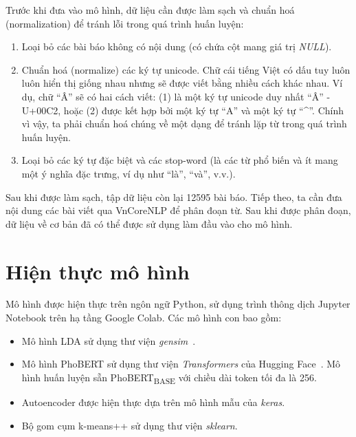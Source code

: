 Trước khi đưa vào mô hình, dữ liệu cần được làm sạch và chuẩn hoá (normalization) để tránh lỗi trong quá trình huấn luyện:
\begin{enumerate}
    \item Loại bỏ các bài báo không có nội dung (có chứa cột mang giá trị \textit{NULL}).
    \item Chuẩn hoá (normalize) các ký tự unicode. Chữ cái tiếng Việt có dấu tuy luôn luôn hiển thị giống nhau nhưng sẽ được viết bằng nhiều cách khác nhau. Ví dụ, chữ ``Â'' sẽ có hai cách viết: (1) là một ký tự unicode duy nhất ``Â'' - U+00C2, hoặc (2) được kết hợp bởi một ký tự ``A'' và một ký tự ``\^{}''. Chính vì vậy, ta phải chuẩn hoá chúng về một dạng để tránh lặp từ trong quá trình huấn luyện.
    \item Loại bỏ các ký tự đặc biệt và các stop-word (là các từ phổ biến và ít mang một ý nghĩa đặc trưng, ví dụ như ``là'', ``và'', v.v.).
\end{enumerate}

Sau khi được làm sạch, tập dữ liệu còn lại 12595 bài báo. Tiếp theo, ta cần đưa nội dung các bài viết qua VnCoreNLP để phân đoạn từ. Sau khi được phân đoạn, dữ liệu về cơ bản đã có thể được sử dụng làm đầu vào cho mô hình.

\section{Hiện thực mô hình}
Mô hình được hiện thực trên ngôn ngữ Python, sử dụng trình thông dịch Jupyter Notebook trên hạ tầng Google Colab. Các mô hình con bao gồm:

\begin{itemize}
    \item Mô hình LDA sử dụng thư viện \textit{gensim}~\cite{GensimTopicModelling2021}.
    \item Mô hình PhoBERT sử dụng thư viện \textit{Transformers} của Hugging Face~\cite{wolfTransformersStateoftheArtNatural2020}. Mô hình huấn luyện sẵn PhoBERT\textsubscript{BASE} với chiều dài token tối đa là 256.
    \item Autoencoder được hiện thực dựa trên mô hình mẫu của \textit{keras}.
    \item Bộ gom cụm k-means++ sử dụng thư viện \textit{sklearn}.
\end{itemize}

